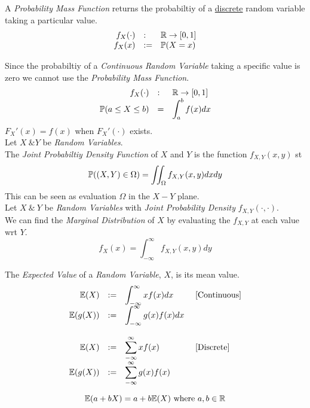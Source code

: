 \documentclass[11pt,a4paper]{article}
\begin{document}
A \textit{Probability Mass Function} returns the probabiltiy of a \underline{discrete} random variable taking a particular value.
\[\begin{array}{rll}
f_X(\cdot)&:&\mathbb{R}\to[0,1]\\
f_X(x)&:=&\mathbb{P}(X=x)\\
\end{array}\]

Since the probabiltiy of a \textit{Continuous Random Variable} taking a specific value is zero we cannot use the \textit{Probability Mass Function}.
\[\begin{array}{rll}
f_X(\cdot)&:&\mathbb{R}\to[0,1]\\
\mathbb{P}(a\leq X\leq b)&=&\displaystyle\int_a^bf(x)dx
\end{array}\]
\nb $F_X'(x)=f(x)$ when $F_X'(\cdot)$ exists.\\

Let $X\ \& Y$ be \textit{Random Variables}.\\
The \textit{Joint Probabiltiy Density Function} of $X$ and $Y$ is the function $f_{X,Y}(x,y)$ st
$$\mathbb{P}((X,Y)\in\Omega)=\iint_\Omega f_{X,Y}(x,y)dxdy$$
\nb This can be seen as evaluation $\Omega$ in the $X-Y$ plane.\\

Let $X\ \&\ Y$ be \textit{Random Variables} with \textit{Joint Probability Density} $f_{X,Y}(\cdot,\cdot)$.\\
We can find the \textit{Marginal Distribution} of $X$ by evaluating the $f_{X,Y}$ at each value wrt $Y$.
$$f_X(x)=\int_{-\infty}^\infty f_{X,Y}(x,y)dy$$

The \textit{Expected Value} of a \textit{Random Variable}, $X$, is its mean value.
\[\begin{array}{rcll}
\mathbb{E}(X)&:=&\displaystyle\int_{-\infty}^\infty xf(x)dx&\text{ [Continuous]}\\
\mathbb{E}(g(X))&:=&\displaystyle\int_{-\infty}^\infty g(x)f(x)dx&\\\\
\mathbb{E}(X)&:=&\displaystyle\sum_{-\infty}^\infty xf(x)&\text{ [Discrete]}\\
\mathbb{E}(g(X))&:=&\displaystyle\sum_{-\infty}^\infty g(x)f(x)&
\end{array}\]

$$\mathbb{E}(a+bX)=a+b\mathbb{E}(X)\text{ where }a,b\in\mathbb{R}$$
\end{document}
